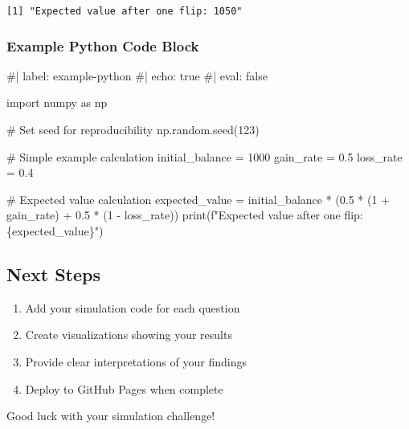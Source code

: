 \documentclass[
  letterpaper,
  DIV=11,
  numbers=noendperiod]{scrartcl}
\newenvironment{Shaded}{\begin{snugshade}}{\end{snugshade}}
\newcommand{\BuiltInTok}[1]{\textcolor[rgb]{0.00,0.23,0.31}{#1}}
\newcommand{\CommentTok}[1]{\textcolor[rgb]{0.37,0.37,0.37}{#1}}
\newcommand{\DecValTok}[1]{\textcolor[rgb]{0.68,0.00,0.00}{#1}}
\newcommand{\FloatTok}[1]{\textcolor[rgb]{0.68,0.00,0.00}{#1}}
\newcommand{\ImportTok}[1]{\textcolor[rgb]{0.00,0.46,0.62}{#1}}
\newcommand{\NormalTok}[1]{\textcolor[rgb]{0.00,0.23,0.31}{#1}}
\newcommand{\OperatorTok}[1]{\textcolor[rgb]{0.37,0.37,0.37}{#1}}
\newcommand{\SpecialCharTok}[1]{\textcolor[rgb]{0.37,0.37,0.37}{#1}}
\newcommand{\SpecialStringTok}[1]{\textcolor[rgb]{0.13,0.47,0.30}{#1}}
\providecommand{\tightlist}{%
  \setlength{\itemsep}{0pt}\setlength{\parskip}{0pt}}
\begin{document}
\begin{verbatim}
[1] "Expected value after one flip: 1050"
\end{verbatim}

\subsubsection{Example Python Code
Block}\label{example-python-code-block}

\begin{Shaded}
\begin{Highlighting}[]
\CommentTok{\#| label: example{-}python}
\CommentTok{\#| echo: true}
\CommentTok{\#| eval: false}

\ImportTok{import}\NormalTok{ numpy }\ImportTok{as}\NormalTok{ np}

\CommentTok{\# Set seed for reproducibility}
\NormalTok{np.random.seed(}\DecValTok{123}\NormalTok{)}

\CommentTok{\# Simple example calculation}
\NormalTok{initial\_balance }\OperatorTok{=} \DecValTok{1000}
\NormalTok{gain\_rate }\OperatorTok{=} \FloatTok{0.5}
\NormalTok{loss\_rate }\OperatorTok{=} \FloatTok{0.4}

\CommentTok{\# Expected value calculation}
\NormalTok{expected\_value }\OperatorTok{=}\NormalTok{ initial\_balance }\OperatorTok{*}\NormalTok{ (}\FloatTok{0.5} \OperatorTok{*}\NormalTok{ (}\DecValTok{1} \OperatorTok{+}\NormalTok{ gain\_rate) }\OperatorTok{+} \FloatTok{0.5} \OperatorTok{*}\NormalTok{ (}\DecValTok{1} \OperatorTok{{-}}\NormalTok{ loss\_rate))}
\BuiltInTok{print}\NormalTok{(}\SpecialStringTok{f"Expected value after one flip: }\SpecialCharTok{\{}\NormalTok{expected\_value}\SpecialCharTok{\}}\SpecialStringTok{"}\NormalTok{)}
\end{Highlighting}
\end{Shaded}

\subsection{Next Steps}\label{next-steps}

\begin{enumerate}
\def\labelenumi{\arabic{enumi}.}
\tightlist
\item
  Add your simulation code for each question
\item
  Create visualizations showing your results
\item
  Provide clear interpretations of your findings
\item
  Deploy to GitHub Pages when complete
\end{enumerate}

Good luck with your simulation challenge! 🎲
\end{document}
